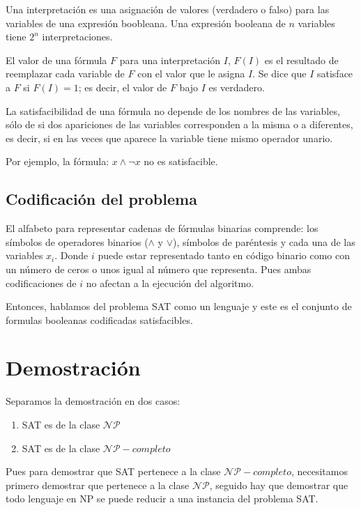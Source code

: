 \documentclass[a4paper]{article}
\begin{document}
Una interpretación es una asignación de valores (verdadero o falso) para las variables de una expresión boobleana. Una expresión booleana de $n$ variables tiene $2^{n}$ interpretaciones.


El valor de una fórmula $F$ para una interpretación $I$, $F(I)$ es el resultado de reemplazar cada variable de $F$ con el valor que le asigna $I$. Se dice que $I$ satisface a $F$ si $F(I) = 1$; es decir, el valor de $F$ bajo $I$ es verdadero.



La satisfacibilidad de una fórmula no depende de los nombres de las variables, sólo de si dos apariciones de las variables corresponden a la misma o a diferentes, es decir, si en las veces que aparece la variable tiene mismo operador unario.


Por ejemplo, la fórmula: $ x \wedge \neg x$ no es satisfacible.


\subsection{Codificación del problema}


El alfabeto para representar cadenas de fórmulas binarias comprende: los símbolos de operadores binarios ($\wedge$ y $\vee$), símbolos de paréntesis y cada una de las variables $x_{i}$. Donde $i$ puede estar representado tanto en código binario como con un número de ceros o unos igual al número que representa. Pues ambas codificaciones de $i$ no afectan a la ejecución del algoritmo.


Entonces, hablamos del problema SAT como un lenguaje y este es el conjunto de formulas booleanas codificadas satisfacibles.


\section{Demostración}

Separamos la demostración en dos casos:

\begin{enumerate}
  \item SAT es de la clase $\mathcal{NP}$
  \item SAT es de la clase $\mathcal{NP}-completo$
\end{enumerate}

Pues para demostrar que SAT pertenece a la clase $\mathcal{NP}-completo$, necesitamos primero demostrar que pertenece a la clase $\mathcal{NP}$, seguido hay que demostrar que todo lenguaje en NP se puede reducir a una instancia del problema SAT.
\end{document}
